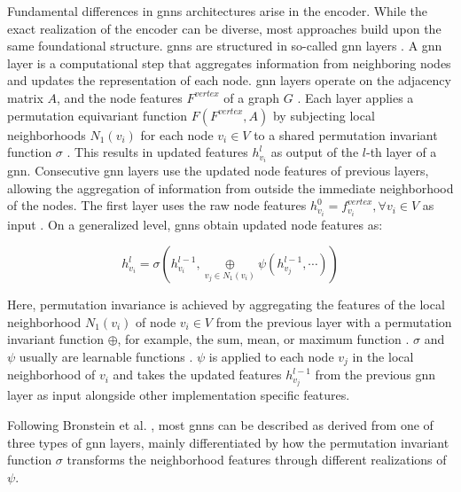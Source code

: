 Fundamental differences in \glspl{gnn} architectures arise in the encoder. While the exact realization of the encoder can be diverse, most approaches build upon the same foundational structure. \glspl{gnn} are structured in so-called \gls{gnn} layers \cite{bronstein_geometric_2021, wu_comprehensive_2021, zhou_graph_2020}. A \gls{gnn} layer is a computational step that aggregates information from neighboring nodes and updates the representation of each node. \gls{gnn} layers operate on the adjacency matrix $A$, and the node features $F^{vertex}$ of a graph $G$ \cite{bronstein_geometric_2021}. Each layer applies a permutation equivariant function $F(F^{vertex}, A)$ by subjecting local neighborhoods $N_1(v_i)$ for each node $v_i \in V$ to a shared permutation invariant function $\sigma$ \cite{bronstein_geometric_2021}. This results in updated features $h_{v_i}^l$ as output of the $l$-th layer of a \gls{gnn}. Consecutive \gls{gnn} layers use the updated node features of previous layers, allowing the aggregation of information from outside the immediate neighborhood of the nodes. The first layer uses the raw node features $h_{v_i}^0 = f^{vertex}_{v_i}, \forall v_i \in V$ as input \cite{hamilton_representation_2017}. On a generalized level, \glspl{gnn} obtain updated node features as:

\begin{equation}
    h_{v_i}^l = \sigma(h_{v_i}^{l-1}, \underset{v_j \in N_1(v_i)}{\oplus} \psi(h_{v_j}^{l-1}, \cdots))
\end{equation}

Here, permutation invariance is achieved by aggregating the features of the local neighborhood $N_1(v_i)$ of node $v_i \in V$ from the previous layer with a permutation invariant function $\oplus$, for example, the sum, mean, or maximum function \cite{bronstein_geometric_2021}. $\sigma$ and $\psi$ usually are learnable functions \cite{bronstein_geometric_2021}. $\psi$ is applied to each node $v_j$ in the local neighborhood of $v_i$ and takes the updated features $h_{v_j}^{l-1}$ from the previous \gls{gnn} layer as input alongside other implementation specific features.

Following Bronstein et al. \cite{bronstein_geometric_2021}, most \glspl{gnn} can be described as derived from one of three types of \gls{gnn} layers, mainly differentiated by how the permutation invariant function $\sigma$ transforms the neighborhood features through different realizations of $\psi$.

